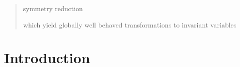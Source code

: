 \documentclass[aip,cha,showpacs,reprint]{revtex4-1} %
\begin{document}

\begin{quotation}
symmetry reduction

which yield {globally} well behaved
transformations to invariant variables

\end{quotation}

\section{Introduction\label{s:intro}}
\end{document}
